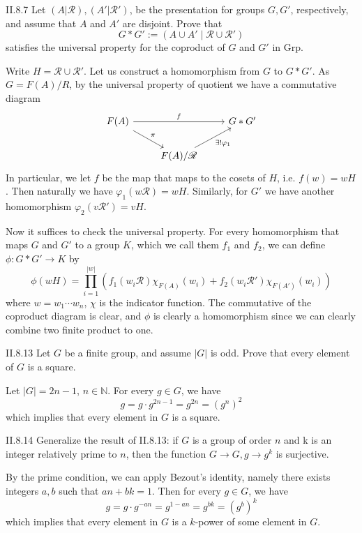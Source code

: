 \begin{problem}{II.8.7}
Let $(A|\mathscr{R}), (A'|\mathscr{R'})$, be the presentation for groups $G, G'$, respectively, and assume that $A$ and $A'$ are disjoint. Prove that
\[
G * G' := (A \cup A' \; |\; \mathscr{R} \cup \mathscr{R'})
\]
satisfies the universal property for the coproduct of $G$ and $G'$ in \textsf{Grp}.
\end{problem}
\begin{pf} Write $H = \mathscr{R} \cup \mathscr{R'}$. Let us construct a homomorphism from $G$ to $G * G'$. As $G = F(A)/R$, by the universal property of quotient we have a commutative diagram
\[
\begin{tikzcd}
F(A) \arrow[rr, "f"] \arrow[rd, "\pi"] &                                                   & G * G' \\
& F(A)/\mathscr{R} \arrow[ru, "\exists!\varphi_1"'] &       
\end{tikzcd}
\]
In particular, we let $f$ be the map that maps to the cosets of $H$, i.e. $f(w) = wH$. Then naturally we have $\varphi_1(w\mathscr{R}) = wH$. Similarly, for $G'$ we have another homomorphism $\varphi_2(v\mathscr{R}') = vH$.

Now it suffices to check the universal property. For every homomorphism that maps $G$ and $G'$ to a group $K$, which we call them $f_1$ and $f_2$, we can define $\phi : G * G' \to K$ by
\[ 
\phi(wH) = \prod_{i = 1}^{|w|} \left( f_1(w_i\mathscr{R}) \chi_{F(A)}(w_i) +  f_2(w_i\mathscr{R}') \chi_{F(A')}(w_i) \right)
\]
where $w = w_1 \cdots w_n$, $\chi$ is the indicator function. The commutative of the coproduct diagram is clear, and $\phi$ is clearly a homomorphism since we can clearly combine two finite product to one.
\end{pf}

\begin{problem}{II.8.13}
Let $G$ be a finite group, and assume $|G|$ is odd. Prove that every element of $G$ is a square.
\end{problem}
\begin{pf}
Let $|G|=2n-1$, $n \in \mathbb{N}$. For every $g \in G$, we have
\[
g = g \cdot g^{2n-1} = g^{2n} = (g^n)^2    
\]
which implies that every element in $G$ is a square.
\end{pf}

\begin{problem}{II.8.14}
Generalize the result of II.8.13: if $G$ is a group of order $n$ and k is an integer relatively prime to $n$, then the function $G \to G, g \to g^k$ is surjective.
\end{problem}
\begin{pf}
By the prime condition, we can apply Bezout's identity, namely there exists integers $a,b$ such that $an + bk = 1$. Then for every $g \in G$, we have
\[
g = g \cdot g^{-an} = g^{1-an} = g^{bk} = (g^b)^k    
\]
which implies that every element in $G$ is a $k$-power of some element in $G$.
\end{pf}    

